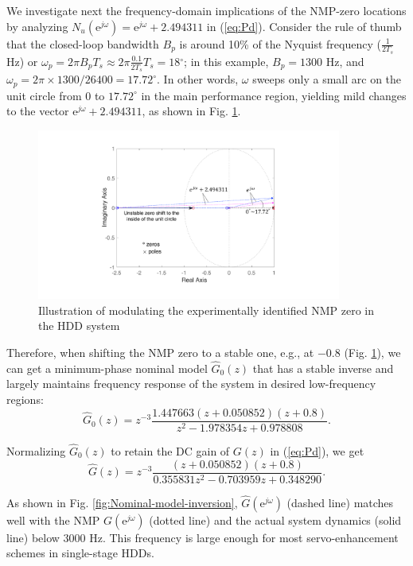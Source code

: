 \documentclass [11pt, proquest] {uwthesis}[2020/02/24]
\begin{document}
We investigate next the frequency-domain implications of the NMP-zero
locations by analyzing $N_{u}(\text{e}^{j\omega})=\text{e}^{j\omega}+2.494311$
in (\ref{eq:Pd}). Consider the rule of thumb that the closed-loop
bandwidth $B_{p}$ is around 10\% of the Nyquist frequency ($\frac{1}{2T_{s}}$
Hz) or $\omega_{p}=2\pi B_{p}T_{s}\approx2\pi\frac{0.1}{2T_{s}}T_{s}=18{}^{\circ}$;
in this example, $B_{p}=1300$ Hz, and $\omega_{p}=2\pi\times1300/26400=17.72^{\circ}$.
In other words, $\omega$ sweeps only a small arc on the unit circle
from 0 to $17.72^{\circ}$ in the main performance region, yielding
mild changes to the vector $\text{e}^{j\omega}+2.494311$, as shown
in Fig. \ref{fig:Pole-zero-plots-of}. 
\begin{figure}[!ht]
\begin{centering}
\includegraphics[width=10cm]{Model-inversion/NMPzeromodulation}
\par\end{centering}
\caption{\label{fig:Pole-zero-plots-of}Illustration of modulating the experimentally
identified NMP zero in the HDD system }
\end{figure}
Therefore, when shifting the NMP zero to a stable one, e.g., at $-0.8$
(Fig. \ref{fig:Pole-zero-plots-of}), we can get a minimum-phase
nominal model $\hat{G}_{0}(z)$ that has a stable inverse and largely
maintains frequency response of the system in desired low-frequency
regions:
\[
\hat{G}_{0}(z)=z^{-3}\frac{1.447663(z+0.050852)(z+0.8)}{z^{2}-1.978354z+0.978808}.
\]

Normalizing $\hat{G}_{0}(z)$ to retain the DC gain of $G(z)$ in
(\ref{eq:Pd}), we get
\begin{equation}
\hat{G}(z)=z^{-3}\frac{(z+0.050852)(z+0.8)}{0.355831z^{2}-0.703959z+0.348290}.\label{eq:G_hat_hdd}
\end{equation}

\noindent As shown in Fig. \ref{fig:Nominal-model-inversion}, $\hat{G}(\text{e}^{j\omega})$
(dashed line) matches well with the NMP $G(\text{e}^{j\omega})$ (dotted
line) and the actual system dynamics (solid line) below $3000$ Hz.
This frequency is large enough for most servo-enhancement schemes
in single-stage HDDs.
\end{document}
